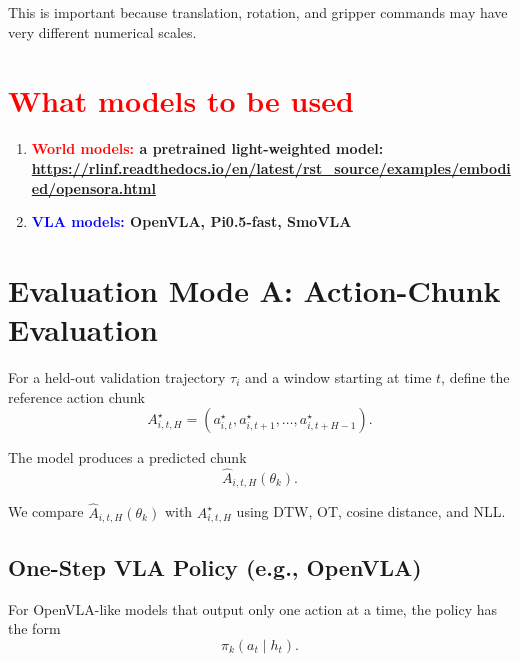 \documentclass[11pt]{article}
\begin{document}
This is important because translation, rotation, and gripper commands may have very different numerical scales.


\section{\textcolor{red}{What models to be used}}

\begin{enumerate}
    \item  \textbf{\textcolor{red}{World models:} a pretrained light-weighted model: \url{https://rlinf.readthedocs.io/en/latest/rst_source/examples/embodied/opensora.html}}


    \item \textbf{\textcolor{blue}{VLA models:} OpenVLA, Pi0.5-fast, SmoVLA}
\end{enumerate}


\section{Evaluation Mode A: Action-Chunk Evaluation}

For a held-out validation trajectory $\tau_i$ and a window starting at time $t$, define the reference action chunk
\begin{equation}
A^{\star}_{i,t,H}=(a^{\star}_{i,t},a^{\star}_{i,t+1},\ldots,a^{\star}_{i,t+H-1}).
\end{equation}

The model produces a predicted chunk
\begin{equation}
\widehat{A}_{i,t,H}(\theta_k).
\end{equation}

We compare $\widehat{A}_{i,t,H}(\theta_k)$ with $A^{\star}_{i,t,H}$ using DTW, OT, cosine distance, and NLL.

\subsection{One-Step VLA Policy (e.g., OpenVLA)}

For OpenVLA-like models that output only one action at a time, the policy has the form
\begin{equation}
\pi_k(a_t\mid h_t).
\end{equation}
\end{document}
